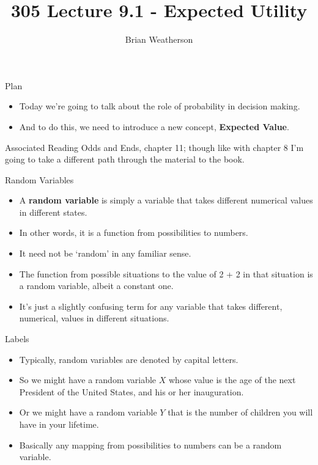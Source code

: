 \documentclass[
  ignorenonframetext,
]{beamer}
\title{305 Lecture 9.1 - Expected Utility}
\author{Brian Weatherson}
\date{}
\providecommand{\tightlist}{%
  \setlength{\itemsep}{0pt}\setlength{\parskip}{0pt}}
\renewcommand{\,}{\text{, }}
\begin{document}
\frame{\titlepage}

\begin{frame}{Plan}
\protect\hypertarget{plan}{}
\begin{itemize}
\tightlist
\item
  Today we're going to talk about the role of probability in decision
  making.
\item
  And to do this, we need to introduce a new concept, \textbf{Expected
  Value}.
\end{itemize}
\end{frame}

\begin{frame}{Associated Reading}
\protect\hypertarget{associated-reading}{}
Odds and Ends, chapter 11; though like with chapter 8 I'm going to take
a different path through the material to the book.
\end{frame}

\begin{frame}{Random Variables}
\protect\hypertarget{random-variables}{}
\begin{itemize}
\tightlist
\item
  A \textbf{random variable} is simply a variable that takes different
  numerical values in different states.
\item
  In other words, it is a function from possibilities to numbers.
\item
  It need not be `random' in any familiar sense.
\item
  The function from possible situations to the value of 2 + 2 in that
  situation is a random variable, albeit a constant one.
\item
  It's just a slightly confusing term for any variable that takes
  different, numerical, values in different situations.
\end{itemize}
\end{frame}

\begin{frame}{Labels}
\protect\hypertarget{labels}{}
\begin{itemize}
\tightlist
\item
  Typically, random variables are denoted by capital letters.
\item
  So we might have a random variable \(X\) whose value is the age of the
  next President of the United States, and his or her inauguration.
\item
  Or we might have a random variable \(Y\) that is the number of
  children you will have in your lifetime.
\item
  Basically any mapping from possibilities to numbers can be a random
  variable.
\end{itemize}
\end{frame}
\end{document}
